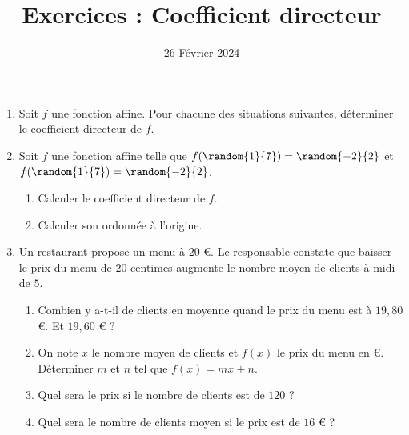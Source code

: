 \documentclass{article}
\author{}
\date{26 Février 2024}
\title{Exercices : Coefficient directeur}
\begin{document}
\maketitle
\begin{enumerate}[label=\textbf{ Exercice \arabic*}]
\item Soit $f$ une fonction affine. Pour chacune des situations suivantes, déterminer le coefficient directeur de $f$.
\begin{enumerate}[label=\emph{\alph*)}]
\end{enumerate}
\item Soit $f$ une fonction affine telle que $f(\random{1}{7}) = \random{-2}{2}$ et $f(\random{1}{7}) = \random{-2}{2}$.
\begin{enumerate}[label=\emph{\alph*)}]
\item Calculer le coefficient directeur de $f$.
\item Calculer son ordonnée à l'origine.
\end{enumerate}
\item Un restaurant propose un menu à $20$ \euro{}. Le responsable constate que baisser le prix du menu de $20$ centimes augmente le nombre moyen de clients à midi de $5$.
\begin{enumerate}[label=\emph{\alph*)}]
\item Combien y a-t-il de clients en moyenne quand le prix du menu est à $19,80$ \euro{}. Et $19,60$ \euro{} ?
\item On note $x$ le nombre moyen de clients et $f(x)$ le prix du menu en \euro{}. Déterminer $m$ et $n$ tel que $f(x) = mx + n$.
\item Quel sera le prix si le nombre de clients est de $120$ ?
\item Quel sera le nombre de clients moyen si le prix est de $16$ \euro{} ? 
\end{enumerate}
\end{enumerate}
\end{document}
